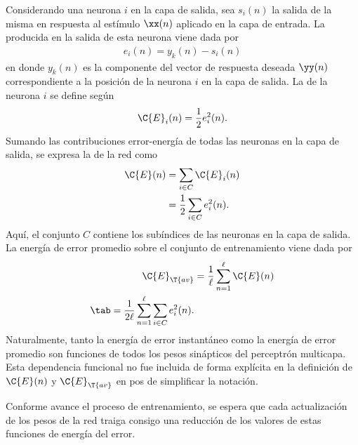 Considerando una neurona $i$ en la capa de salida, sea $s_i(n)$ la
salida de la misma en respuesta al estímulo $\xx(n)$ aplicado en la
capa de entrada.
La
 producida en la salida de esta neurona viene dada
por
%
\begin{align}\label{e2:error-signal-neuron} %
  e_i(n)=y_{k}(n)-s_{i}(n)
\end{align}
%
en donde $y_k(n)$ es la componente del vector de respuesta deseada
$\yy(n)$ correspondiente a la posición de la neurona $i$ en la capa de
salida.
La  de la neurona $i$ se define según
%
\begin{align}\label{e2:error-energy-neuron} %
  \C{E}_i(n)=\frac{1}{2}e^2_i(n).
\end{align}
%
Sumando las contribuciones error-energía de todas las neuronas en la
capa de salida, se expresa la 
de la red como
%
\begin{align}\label{e2:error-energy-net} %
  \C{E}(n)&=\sum_{i\in C}\C{E}_i(n) \\
  &=\frac{1}{2}\sum_{i\in C}e^2_i(n).
\end{align}
%
Aquí, el conjunto $C$ contiene los subíndices de las
neuronas en la capa de salida. La energía de error promedio sobre el
conjunto de entrenamiento
viene dada por
%
\begin{align}\label{e2:average-energy-net} %
  \C{E}_{\T{av}}&=\frac{1}{\ell}\sum_{n=1}^\ell\C{E}(n) \\
  \tab=\frac{1}{2\ell} \sum_{n=1}^\ell \sum_{i\in C}e^2_i(n).
\end{align}
%
Naturalmente, tanto la energía de error instantáneo como la energía de
error promedio son funciones de todos los pesos sinápticos del
perceptrón multicapa. Esta dependencia funcional no fue incluida de
forma explícita en la definición de $\C{E}(n)$ y
$\C{E}_{\T{av}}$ en pos de simplificar la notación.

Conforme avance el proceso de entrenamiento, se espera que cada
actualización de los pesos de la red traiga consigo una reducción de
los valores de estas funciones de energía del error.
